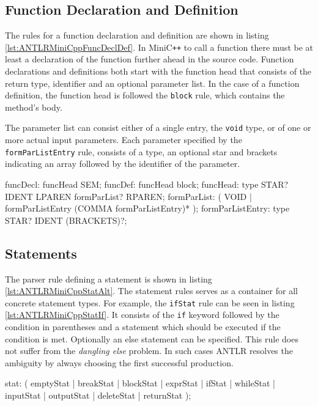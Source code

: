 \subsection{Function Declaration and Definition}

The rules for a function declaration and definition are shown in listing \ref{lst:ANTLRMiniCppFuncDeclDef}. In MiniC\verb|++| to call a function there must be at least a declaration of the function further ahead in the source code. Function declarations and definitions both start with the function head that consists of the return type, identifier and an optional parameter list. In the case of a function definition, the function head is followed the \texttt{block} rule, which contains the method's body. 

The parameter list can consist either of a single entry, the \texttt{void} type, or of one or more actual input parameters. Each parameter specified by the \texttt{formParListEntry} rule, consists of a type, an optional star and brackets indicating an array followed by the identifier of the parameter.


\begin{AntlrCode}[float,numbers=none,caption=Function declaration and defintion of the MiniC++ ANTLR grammar., label=lst:ANTLRMiniCppFuncDeclDef]
funcDecl:         funcHead SEM;
funcDef:          funcHead block;
funcHead:         type STAR? IDENT LPAREN formParList? RPAREN;
formParList:      (     VOID
                  |     formParListEntry (COMMA formParListEntry)*
                  );
formParListEntry: type STAR? IDENT (BRACKETS)?;
\end{AntlrCode}

\subsection{Statements}

The parser rule defining a statement is shown in listing \ref{lst:ANTLRMiniCppStatAlt}. The statement rules serves as a container for all concrete statement types. For example, the \texttt{ifStat} rule can be seen in listing \ref{lst:ANTLRMiniCppStatIf}. It consists of the \texttt{if} keyword followed by the condition in parentheses and a statement which should be executed if the condition is met. Optionally an else statement can be specified. This rule does not suffer from the \textit{dangling else} problem. In such cases ANTLR resolves the ambiguity by always choosing the first successful production. 

\begin{AntlrCode}[float,numbers=none,caption=Statement rule and it's production alternatives of the MiniC++ ANTLR grammar., label=lst:ANTLRMiniCppStatAlt]
stat:  ( emptyStat  | breakStat
       | blockStat  | exprStat
       | ifStat     | whileStat
       | inputStat  | outputStat
       | deleteStat | returnStat
       );
\end{AntlrCode}


